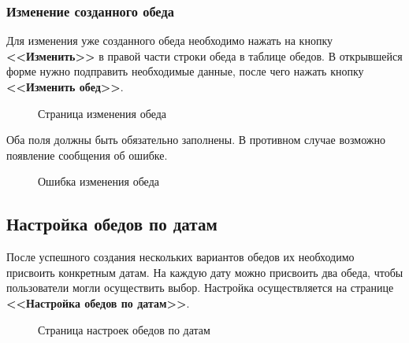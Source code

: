 \documentclass[a4paper]{article}
\begin{document}
\subsubsection{Изменение созданного обеда}

Для изменения уже созданного обеда необходимо нажать на кнопку \textbf{<<Изменить>>} в правой части строки обеда в таблице обедов. В открывшейся форме нужно подправить необходимые данные, после чего нажать кнопку \textbf{<<Изменить обед>>}.

\begin{figure}[h]
\caption{Страница изменения обеда}
\label{fig:image19}
\end{figure}

Оба поля должны быть обязательно заполнены. В противном случае возможно появление сообщения об ошибке.

\begin{figure}[h]
\caption{Ошибка изменения обеда}
\label{fig:image20}
\end{figure}

\subsection{Настройка обедов по датам}

После успешного создания нескольких вариантов обедов их необходимо присвоить конкретным датам. На каждую дату можно присвоить два обеда, чтобы пользователи могли осуществить выбор. Настройка осуществляется на странице \textbf{<<Настройка обедов по датам>>}.

\begin{figure}[h]
\caption{Страница настроек обедов по датам}
\label{fig:image21}
\end{figure}
\end{document}
